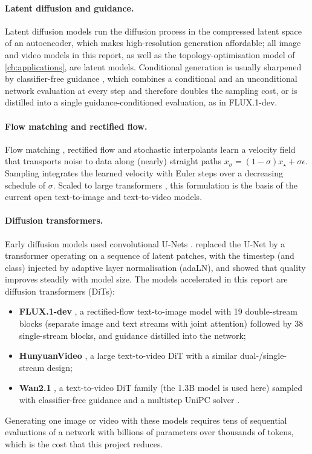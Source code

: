 \paragraph{Latent diffusion and guidance.} Latent diffusion models \citep{rombach2022ldm} run the diffusion process in the compressed latent space of an autoencoder, which makes high-resolution generation affordable; all image and video models in this report, as well as the topology-optimisation model of \cref{ch:applications}, are latent models. Conditional generation is usually sharpened by classifier-free guidance \citep{ho2022cfg}, which combines a conditional and an unconditional network evaluation at every step and therefore doubles the sampling cost, or is distilled into a single guidance-conditioned evaluation, as in FLUX.1-dev.

\paragraph{Flow matching and rectified flow.} Flow matching \citep{lipman2023flow}, rectified flow \citep{liu2023rectifiedflow} and stochastic interpolants \citep{albergo2023stochastic} learn a velocity field that transports noise to data along (nearly) straight paths $x_\sigma = (1-\sigma)x_\star + \sigma\epsilon$. Sampling integrates the learned velocity with Euler steps over a decreasing schedule of $\sigma$. Scaled to large transformers \citep{esser2024sd3}, this formulation is the basis of the current open text-to-image and text-to-video models.

\paragraph{Diffusion transformers.} Early diffusion models used convolutional U-Nets \citep{ronneberger2015unet,dhariwal2021diffusion}. \citet{peebles2023dit} replaced the U-Net by a transformer \citep{vaswani2017attention} operating on a sequence of latent patches, with the timestep (and class) injected by adaptive layer normalisation (adaLN), and showed that quality improves steadily with model size. The models accelerated in this report are diffusion transformers (DiTs):
\begin{itemize}
  \item \textbf{FLUX.1-dev} \citep{bfl2024flux}, a rectified-flow text-to-image model with 19 double-stream blocks (separate image and text streams with joint attention) followed by 38 single-stream blocks, and guidance distilled into the network;
  \item \textbf{HunyuanVideo} \citep{kong2024hunyuanvideo}, a large text-to-video DiT with a similar dual-/single-stream design;
  \item \textbf{Wan2.1} \citep{wan2025wan}, a text-to-video DiT family (the 1.3B model is used here) sampled with classifier-free guidance and a multistep UniPC solver \citep{zhao2023unipc}.
\end{itemize}
Generating one image or video with these models requires tens of sequential evaluations of a network with billions of parameters over thousands of tokens, which is the cost that this project reduces.

